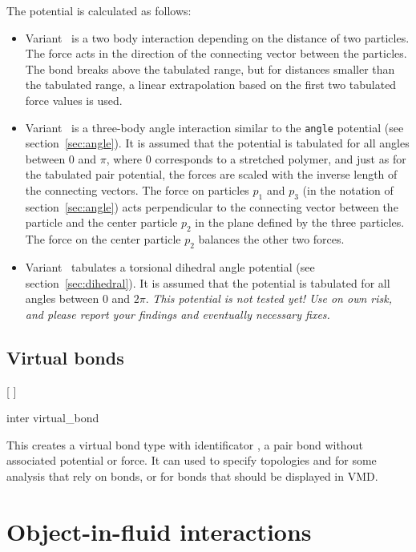 The potential is calculated as follows:
\begin{itemize}
\item Variant~ is a two body interaction depending on the distance of
  two particles. The force acts in the direction of the connecting vector
  between the particles. The bond breaks above the tabulated range, but for
  distances smaller than the tabulated range, a linear extrapolation based on
  the first two tabulated force values is used.
\item Variant~ is a three-body angle interaction similar to the
  \texttt{angle} potential (see section~\ref{sec:angle}).  It is assumed that
  the potential is tabulated for all angles between 0 and $ \pi $, where 0
  corresponds to a stretched polymer, and just as for the tabulated pair
  potential, the forces are scaled with the inverse length of the connecting
  vectors. The force on particles $p_1$ and $p_3$ (in the notation of
  section~\ref{sec:angle}) acts perpendicular to the connecting vector between
  the particle and the center particle $p_2$ in the plane defined by the three
  particles. The force on the center particle $p_2$ balances the other two
  forces.
\item Variant~ tabulates a torsional dihedral angle potential (see
  section~\ref{sec:dihedral}). It is assumed that the potential is tabulated for
  all angles between 0 and $2\pi$. \em{This potential is not tested yet! Use on
    own risk, and please report your findings and eventually necessary fixes.}
\end{itemize}

\subsection{Virtual bonds}
\PythonSyntaxOn
\begin{pysyntax}
  [
  ]
\end{pysyntax}
\PythonSyntaxOff
\begin{essyntax}
  inter  virtual_bond
\end{essyntax}

This creates a virtual bond type with identificator , \ie
a pair bond without associated potential or force. It can used to specify
topologies and for some analysis that rely on bonds, or \eg for bonds that
should be displayed in VMD.

\section{Object-in-fluid interactions}
\label{sec:inter-bonded-oif}

